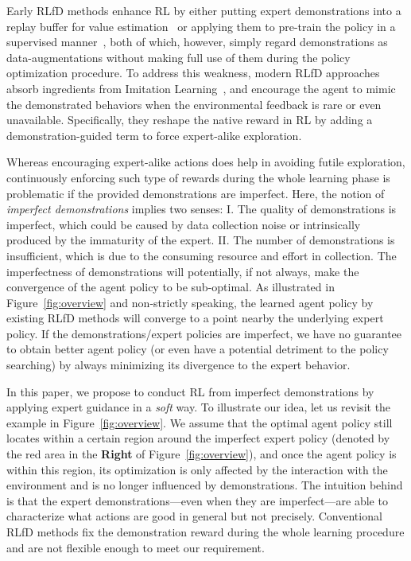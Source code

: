 \documentclass[letterpaper]{article} %
\begin{document}
Early RLfD methods enhance RL by either putting expert demonstrations into a replay buffer for value estimation~\cite{dqfd,ddpgfd} or applying them to pre-train the policy in a supervised manner~\cite{pretrain1,pretrain2}, both of which, however, simply regard demonstrations as data-augmentations without making full use of them during the policy optimization procedure. To address this weakness, modern RLfD approaches~\cite{thor,pofd} absorb ingredients from Imitation Learning~\cite{lfd1,Apprenticeship,MaxEntIRL,GAIL,pbganirl,iddm}, and encourage the agent to mimic the demonstrated behaviors when the environmental feedback is rare or even unavailable. Specifically, they reshape the native reward in RL by adding a demonstration-guided term to force expert-alike exploration.

Whereas encouraging expert-alike actions does help in avoiding futile exploration, continuously enforcing such type of rewards during the whole learning phase is problematic if the provided demonstrations are imperfect. Here, the notion of \emph{imperfect demonstrations} implies two senses: I. The quality of demonstrations is imperfect, which could be caused by data collection noise or intrinsically produced by the immaturity of the expert. II. The number of demonstrations is insufficient, which is due to the consuming resource and effort in collection. The imperfectness of demonstrations will potentially, if not always, make the convergence of the agent policy to be sub-optimal. As illustrated in Figure~\ref{fig:overview} and non-strictly speaking, the learned agent policy by existing RLfD methods will converge to a point nearby the underlying expert policy. If the demonstrations/expert policies are imperfect, we have no guarantee to obtain better agent policy (or even have a potential detriment to the policy searching) by always minimizing its divergence to the expert behavior.

In this paper, we propose to conduct RL from imperfect demonstrations by applying expert guidance in a \emph{soft} way. To illustrate our idea, let us revisit the example in Figure~\ref{fig:overview}. We assume that the optimal agent policy still locates within a certain region around the imperfect expert policy (denoted by the red area in the \textbf{Right} of  Figure~\ref{fig:overview}), and once the agent policy is within this region, its optimization is only affected by the interaction with the environment and is no longer influenced by demonstrations. The intuition behind is that the expert demonstrations---even when they are imperfect---are able to characterize what actions are good in general but not precisely. Conventional RLfD methods fix the demonstration reward during the whole learning procedure and are not flexible enough to meet our requirement.
\end{document}
